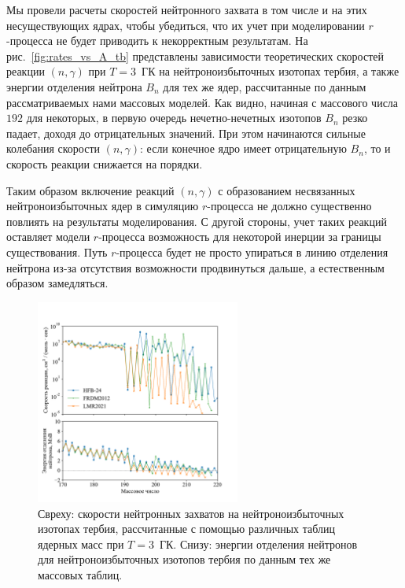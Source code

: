 Мы провели расчеты скоростей нейтронного захвата в том числе и на этих несуществующих ядрах, чтобы убедиться, что их учет при моделировании $r$-процесса не будет приводить к некорректным результатам. На рис.~\ref{fig:rates_vs_A_tb} представлены зависимости теоретических скоростей реакции $(n,\gamma)$ при $T = 3$~ГК на нейтроноизбыточных изотопах тербия, а также энергии отделения нейтрона $B_n$ для тех же ядер, рассчитанные по данным рассматриваемых нами массовых моделей. Как видно, начиная с массового числа $192$ для некоторых, в первую очередь нечетно-нечетных изотопов $B_n$ резко падает, доходя до отрицательных значений. При этом начинаются сильные колебания скорости $(n,\gamma)$: если конечное ядро имеет отрицательную $B_n$, то и скорость реакции снижается на порядки. 

Таким образом включение реакций $(n,\gamma)$ с образованием несвязанных нейтроноизбыточных ядер в симуляцию $r$-процесса не должно существенно повлиять на результаты моделирования. С другой стороны, учет таких реакций оставляет модели $r$-процесса возможность для некоторой инерции за границы существования. Путь $r$-процесса будет не просто упираться в линию отделения нейтрона из-за отсутствия возможности продвинуться дальше, а естественным образом замедляться.  

\begin{figure}
  \centering
  \includegraphics[width=0.6\textwidth]{pics/rates_vs_A_tb.pdf}
  \caption{Свреху: скорости нейтронных захватов на нейтроноизбыточных изотопах тербия, рассчитанные с помощью различных таблиц ядерных масс при $T = 3$~ГК. Снизу: энергии отделения нейтронов для нейтроноизбыточных изотопов тербия по данным тех же массовых таблиц.}
  \label{fig:rates_vs_A}
\end{figure}

